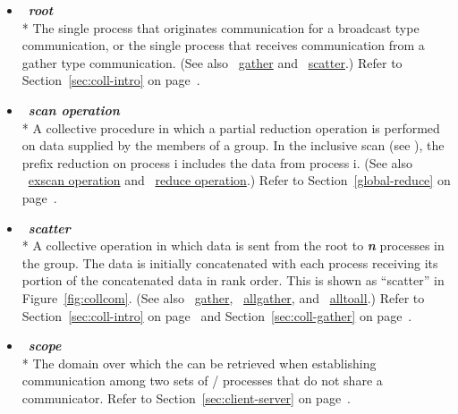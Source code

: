 \begin{itemize}
\label{glossary:root}
\item  ~\hypertarget{glossary:root}{\emph{\textbf{root}}} \\*
The single process that originates communication for a broadcast type communication,
or the single process that receives communication from a gather type communication.
(See also ~\hyperlink{glossary:gather}{gather} and ~\hyperlink{glossary:scatter}{scatter}.)
Refer to Section~\ref{sec:coll-intro} on page~\pageref{sec:coll-intro}.

\label{glossary:scan_operation}
\item  ~\hypertarget{glossary:scan_operation}{\emph{\textbf{scan operation}}} \\*
A collective procedure in which a partial reduction operation is performed on data supplied by the members of a group.
In the inclusive scan (see ), the prefix reduction on process i includes the data from process i. 
(See also ~\hyperlink{glossary:exscan_operation}{exscan operation} and
~\hyperlink{glossary:reduce_operation}{reduce operation}.)
Refer to Section~\ref{global-reduce} on page~\pageref{global-reduce}.

\label{glossary:scatter}
\item  ~\hypertarget{glossary:scatter}{\emph{\textbf{scatter}}} \\*
A collective operation in which data is sent from  the root 
to \emph{\textbf{n}} processes in the group. The data is initially concatenated
with each process receiving its portion of the concatenated data in rank order.
This is shown as ``scatter'' in Figure~\ref{fig:collcom}.
(See also ~\hyperlink{glossary:gather}{gather},
~\hyperlink{glossary:allgather}{allgather},
and ~\hyperlink{glossary:alltoall}{alltoall}.)
Refer to Section~\ref{sec:coll-intro} on page~\pageref{sec:coll-intro} and  
Section~\ref{sec:coll-gather} on page~\pageref{sec:coll-gather}.

\label{glossary:scope}
\item  ~\hypertarget{glossary:scope}{\emph{\textbf{scope}}} \\*
The domain over which the  
can be retrieved when establishing communication among
two sets of \MPI/ processes that do not share a communicator.
Refer to Section~\ref{sec:client-server} on page~\pageref{sec:client-server}.


\end{itemize}
